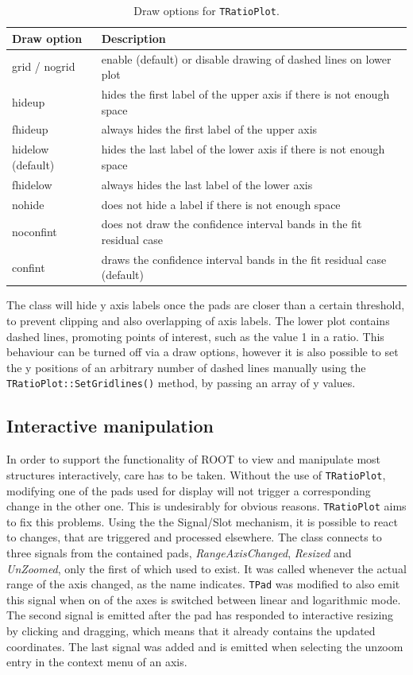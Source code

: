 \begin{table}[hb]
  \centering
  \begin{tabular}{l|l}
    Draw option & Description \\
    \hline
    grid / nogrid & enable (default) or disable drawing of dashed lines on lower plot \\
    hideup & hides the first label of the upper axis if there is not enough space \\
    fhideup & always hides the first label of the upper axis \\
    hidelow (default) & hides the last label of the lower axis if there is not enough space \\
    fhidelow & always hides the last label of the lower axis \\
    nohide & does not hide a label if there is not enough space \\
    noconfint & does not draw the confidence interval bands in the fit residual case \\
    confint & draws the confidence interval bands in the fit residual case (default) \\
  \end{tabular}  
  \caption{Draw options for \texttt{TRatioPlot}.}
  \label{tab:drawopt}
\end{table}

\noindent
The class will hide y axis labels once the pads are closer than a certain threshold, to prevent clipping
and also overlapping of axis labels. The lower plot contains dashed lines, promoting points of interest,
such as the value 1 in a ratio. This behaviour can be turned off via a draw options, however it is 
also possible to set the y positions of an arbitrary number of dashed lines manually using the
\texttt{TRatioPlot::SetGridlines()} method, by passing an array of y values.

\subsection{Interactive manipulation}

In order to support the functionality of ROOT to view and manipulate most structures interactively,
care has to be taken. Without the use of \texttt{TRatioPlot}, modifying one of the pads used for
display will not trigger a corresponding change in the other one. This is undesirably for obvious reasons.
\texttt{TRatioPlot} aims to fix this problems. Using the the Signal/Slot mechanism, it is possible 
to react to changes, that are triggered and processed elsewhere. The class connects to three signals
from the contained pads, \emph{RangeAxisChanged}, \emph{Resized} and \emph{UnZoomed}, only the first
of which used to exist. It was called whenever the actual range of the axis changed, as the name
indicates. \texttt{TPad} was modified to also emit this signal when on of the axes is switched
between linear and logarithmic mode. The second signal is emitted after the pad has responded to 
interactive resizing by clicking and dragging, which means that it already contains the updated
coordinates. The last signal was added and is emitted when selecting the unzoom entry in the context
menu of an axis. 

